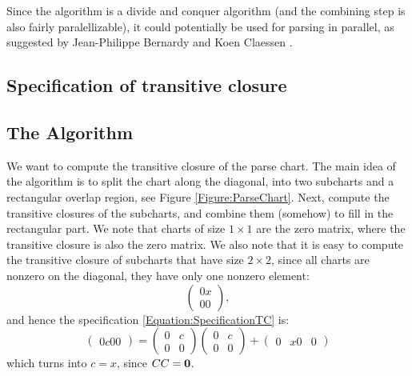 \documentclass{article}
\begin{document}
Since the algorithm is a divide and conquer algorithm (and the combining step is also fairly paralellizable), it could potentially be used for parsing in parallel, as suggested by Jean-Philippe Bernardy and Koen Claessen \cite{JP-PP}. 

\subsection{Specification of transitive closure}

\subsection{The Algorithm} 
We want to compute the transitive closure of the parse chart. The main idea of the algorithm is to split the chart along the diagonal, into two subcharts and a rectangular overlap region, see Figure \ref{Figure:ParseChart}. Next, compute the transitive closures of the subcharts, and combine them (somehow) to fill in the rectangular part. We note that charts of size $1 \times 1$ are the zero matrix, where the transitive closure is also the zero matrix. We also note that it is easy to compute the transitive closure of subcharts that have size $2 \times 2$, since all charts are nonzero on the diagonal, they have only one nonzero element:
\begin{equation*}
  \begin{pmatrix}
    0 x \\
    0 0
  \end{pmatrix},
\end{equation*}
and hence the specification \eqref{Equation:SpecificationTC} is: 
\begin{equation*}
  \begin{pmatrix}
    0 c
    0 0
  \end{pmatrix}
  = 
  \begin{pmatrix}
    0 & c\\
    0 & 0 
  \end{pmatrix}
  \begin{pmatrix}
    0 & c \\
    0 & 0
  \end{pmatrix}
  + 
  \begin{pmatrix}
    0 & x
    0 & 0
  \end{pmatrix}
\end{equation*}
which turns into $c = x$, since $CC = \mathbf{0}$.
\end{document}
